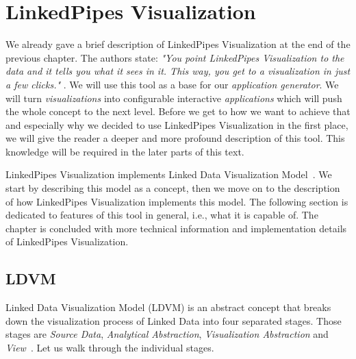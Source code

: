 \chapter{LinkedPipes Visualization}
\label{chap:linkedpipes-visualization}

We already gave a brief description of LinkedPipes Visualization \cite{linked_pipes_visualization} at the end of the previous chapter. The authors state: \emph{"You point LinkedPipes Visualization to the data and it tells you what it sees in it. This way, you get to a visualization in just a few clicks."}  \cite{linked_pipes_visualization}. We will use this tool as a base for our \emph{application generator}. We will turn \emph{visualizations} into configurable interactive \emph{applications} which will push the whole concept to the next level. Before we get to how we want to achieve that and especially why we decided to use LinkedPipes Visualization in the first place, we will give the reader a deeper and more profound description of this tool. This knowledge will be required in the later parts of this text.

LinkedPipes Visualization implements Linked Data Visualization \linebreak Model~\cite{ldvm}\cite{ldvm_use_cases}. We start by describing this model as a concept, then we move on to the description of how LinkedPipes Visualization implements this model. The following section is dedicated to features of this tool in general, i.e., what it is capable of. The chapter is concluded with more technical information and implementation details of LinkedPipes Visualization.

\section{LDVM}

Linked Data Visualization Model (LDVM) \cite{ldvm} is an abstract concept that breaks down the visualization process of Linked Data into four separated stages. Those stages are \emph{Source Data}, \emph{Analytical Abstraction}, \emph{Visualization Abstraction} and \emph{View}~\cite{ldvm}. Let us walk through the individual stages.


